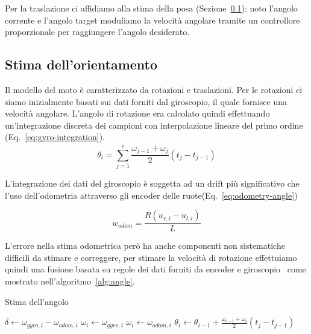 \documentclass[a4paper]{article}
\begin{document}
	Per la traslazione ci affidiamo alla stima della posa
	(Sezione~\ref{subsec:Orientamento}): noto l'angolo corrente e l'angolo
	target moduliamo la velocità angolare tramite un controllore proporzionale
	per raggiungere l'angolo desiderato.
	

	\subsection{Stima dell'orientamento}\label{subsec:Orientamento}
	Il modello del moto è caratterizzato da rotazioni e traslazioni. Per le
	rotazioni ci siamo inizialmente basati sui dati forniti dal giroscopio, il
	quale fornisce una velocità angolare. L'angolo di rotazione era calcolato
	quindi effettuando un'integrazione discreta dei campioni con interpolazione
	lineare del primo ordine (Eq.~\ref{eq:gyro-integration}).  
	\begin{equation}\label{eq:gyro-integration}
		\theta_i = \sum_{j=1}^i \frac{\omega _{j-1}+\omega _j}{2} \left( t_j-t_{j-1} \right) 
	\end{equation}

	L'integrazione dei dati del giroscopio è soggetta ad un drift più
	significativo che l'uso dell'odometria attraverso gli encoder delle
	ruote(Eq.~\ref{eq:odometry-angle})

	\begin{equation}\label{eq:odometry-angle}
		w_{odom}= \frac	{R(u_{r,i}-u_{l,i})} {L} 
	\end{equation}
	
	L'errore nella stima odometrica però ha anche componenti non sistematiche
	difficili da stimare e correggere, per stimare la velocità di rotazione
	effettuiamo quindi una fusione basata su regole dei dati forniti da encoder
	e giroscopio~\cite{gyrodometry, 572228} come mostrato
	nell'algoritmo~\ref{alg:angle}.

	\begin{algorithm}[H]
	\caption{Stima dell'angolo}\label{alg:angle}
		\DontPrintSemicolon
		\SetAlgoLined
		
		$ \delta \leftarrow \omega_{gyro,i}-\omega_{odom,i} $ \;
			{$\omega_i \leftarrow \omega_{gyro,i}$}
		\Else 
			{$\omega_i \leftarrow \omega_{odom,i}$}
		$\theta_i \leftarrow  \theta_{i-1}+ \frac{\omega _{i-1}+\omega _i}{2} \left( t_j-t_{j-1} \right) $\;

		\;
	\end{algorithm}
\end{document}
